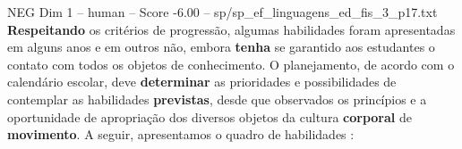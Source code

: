 \begin{textsample}{NEG Dim 1 – human – Score -6.00 – sp/sp\_ef\_linguagens\_ed\_fis\_3\_p17.txt}  \label{ex:f1_neg_013}
\textbf{Respeitando} os critérios de progressão, algumas habilidades foram apresentadas em alguns anos e em outros não, embora \textbf{tenha} se garantido aos estudantes o contato com todos os objetos de conhecimento.
O planejamento, de acordo com o calendário escolar, deve \textbf{determinar} as prioridades e possibilidades de contemplar as habilidades \textbf{previstas}, desde que observados os princípios e a oportunidade de apropriação dos diversos objetos da cultura \textbf{corporal} de \textbf{movimento}.
A seguir, apresentamos o quadro de habilidades :

\end{textsample}
